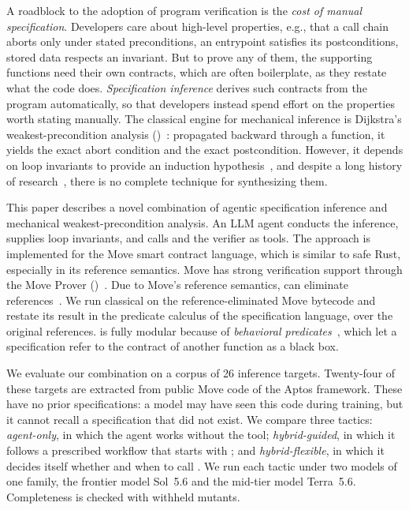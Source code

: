 \label{sec:intro}

A roadblock to the adoption of program verification is the \emph{cost of manual specification}.
Developers care about high-level properties, e.g., that a call chain aborts only under stated preconditions, an entrypoint satisfies its postconditions, stored data respects an invariant.
But to prove any of them, the supporting functions need their own contracts, which are often boilerplate, as they restate what the code does.
\emph{Specification inference} derives such contracts from the program automatically, so that developers instead spend effort on the properties worth stating manually.
The classical engine for mechanical inference is Dijkstra's weakest-precondition analysis (\WP)~\cite{dijkstra1975wp}: propagated backward through a function, it yields the exact abort condition and the exact postcondition. However, it depends on loop invariants to provide an induction hypothesis~\cite{BL05}, and despite a long history of research~\cite{CousotHalbwachs78}, there is no complete technique for synthesizing them.

This paper describes a novel combination of agentic specification inference and mechanical weakest-precondition analysis.
An LLM agent conducts the inference, supplies loop invariants, and calls \WP and the verifier as tools.
The approach is implemented for the Move smart contract language, which is similar to safe Rust, especially in its reference semantics.
Move has strong verification support through the Move Prover (\MVP)~\cite{DillGPQXZ22,GrieskampEtAl26HO}.
Due to Move's reference semantics, \MVP can eliminate references~\cite{DillGPQXZ22}.
We run classical \WP on the reference-eliminated Move bytecode and restate its result in the predicate calculus of the specification language, over the original references.
\WP is fully modular because of \emph{behavioral predicates}~\cite{GrieskampEtAl26HO}, which let a specification refer to the contract of another function as a black box.

We evaluate our combination on a corpus of 26 inference targets.
Twenty-four of these targets are extracted from public Move code of the Aptos framework.
These have no prior specifications: a model may have seen this code during training, but it cannot recall a specification that did not exist.
We compare three tactics:
\textit{agent-only}, in which the agent works without the \WP tool;
\textit{hybrid-guided}, in which it follows a prescribed workflow that starts with \WP;
and \textit{hybrid-flexible}, in which it decides itself whether and when to call \WP.
We run each tactic under two models of one family, the frontier model Sol~5.6 and the mid-tier model Terra~5.6.
Completeness is checked with withheld mutants.

